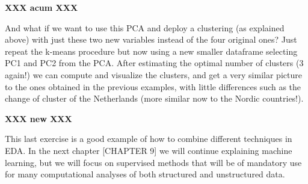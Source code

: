 \textbf{XXX  acum  XXX}

And what if we want to use this PCA and deploy a clustering (as explained above) with just these two new variables instead of the four original ones?  Just repeat the k-means procedure but now using a new smaller dataframe selecting PC1 and PC2 from the PCA. After estimating the optimal number of clusters (3 again!) we can compute and visualize the clusters, and get a very similar picture to the ones obtained in the previous examples, with little differences such as the change of cluster of the Netherlands (more similar now to the Nordic countries!). 

\textbf{XXX  new  XXX}

This last exercise is a good example of how to combine different techniques in EDA. In the next chapter [CHAPTER 9] we will continue explaining machine learning, but we will focus on supervised methods that will be of mandatory use for many computational analyses of both structured and unstructured data.